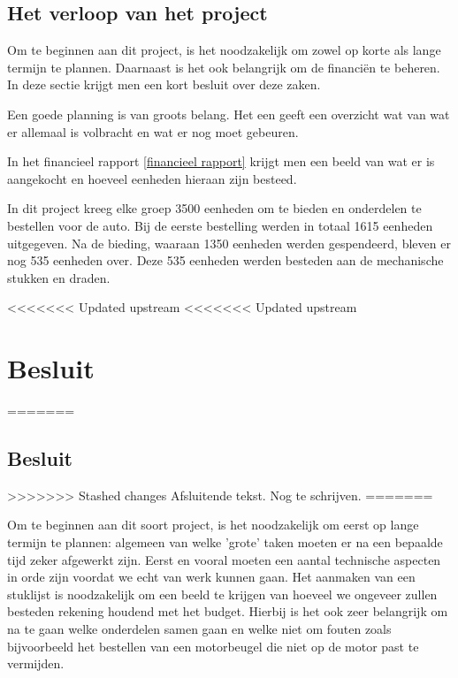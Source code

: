 \documentclass[a4paper,twoside,kulak]{kulakreport} %
\begin{document}
\section{Het verloop van het project}
Om te beginnen aan dit project, is het noodzakelijk om zowel op korte als lange termijn te plannen. Daarnaast is het ook belangrijk om de financiën te beheren. In deze sectie krijgt men een kort besluit over deze zaken.

Een goede planning is van groots belang. Het een geeft een overzicht wat van wat er allemaal is volbracht en wat er nog moet gebeuren.%

In het financieel rapport \ref{financieel rapport} krijgt men een beeld van wat er is aangekocht en hoeveel eenheden hieraan zijn besteed. 

In dit project kreeg elke groep 3500 eenheden om te bieden en onderdelen te bestellen voor de auto. Bij de eerste bestelling werden in totaal 1615 eenheden uitgegeven. Na de bieding, waaraan 1350 eenheden werden gespendeerd, bleven er nog 535 eenheden over. Deze 535 eenheden werden besteden aan de mechanische stukken en draden.

<<<<<<< Updated upstream
<<<<<<< Updated upstream
\chapter*{Besluit}
=======
\section{Besluit}
>>>>>>> Stashed changes
Afsluitende tekst. Nog te schrijven.
=======



Om te beginnen aan dit soort project, is het noodzakelijk om eerst op lange termijn te plannen: algemeen van welke 'grote' taken moeten er na een bepaalde tijd zeker afgewerkt zijn. Eerst en vooral moeten een aantal technische aspecten in orde zijn voordat we echt van werk kunnen gaan. Het aanmaken van een stuklijst is noodzakelijk om een beeld te krijgen van hoeveel we ongeveer zullen besteden rekening houdend met het budget. Hierbij is het ook zeer belangrijk om na te gaan welke onderdelen samen gaan en welke niet om fouten zoals bijvoorbeeld het bestellen van een motorbeugel die niet op de motor past te vermijden.
\end{document}
